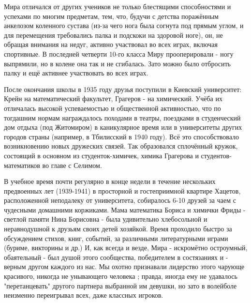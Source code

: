Мира отличался от других учеников не только блестящими способностями и успехами по многим предметам, тем, что, будучи с детства поражённым анкелозом коленного сустава (из-за чего нога была согнута под прямым углом, и для перемещения требовались палка и подскоки на здоровой ноге), он, не обращая внимания на недуг, активно участвовал во всех играх, включая спортивные. В последней четверти 10-го класса Миру прооперировали - ногу выпрямили, но в колене она так и не сгибалась. Зато можно было отбросить палку и ещё активнее участвовать во всех играх.

После окончания школы в 1935 году друзья поступили в Киевский университет: Крейн на математический факультет, Грагеров - на химический. Учёба их отличалась высокой успеваемостью и общественной активностью, что по тогдашним нормам награждалось походами в театры, поездками в студенческий дом отдыха (под Житомиром) в каникулярное время или в университеты других городов страны (например, в Тбилисский в 1940 году). Всё это способствовало возникновению новых дружеских связей. Так образовался сплочённый кружок, состоящий в основном из студенток-химичек, химика Грагерова и студентов-математиков во главе с Селимом.

В учебное время почти регулярно в конце недели в течение нескольких предвоенных лет (1939-1941) в просторной и гостеприимной квартире Хацетов, расположенной неподалеку от университета, собиралось 6-10 друзей за чаем с чудесными домашними коржиками. Мама математика Бориса и химички Фриды - светлой памяти Нина Борисовна - была удивительно хлебосольной и неравнодушной к друзьям своих детей хозяйкой. Время проходило быстро за обсуждением стихов, книг, событий, за различными литературными играми (буриме, викторины и др.) И, как всегда и везде, Мира - искромётно остроумный, обаятельный - был душой этого сообщества, победителем в состязаниях и - верным другом каждого из нас. Мы охотно признавали лидерство этого чарующе красивого, никогда не унывающего человека ; правда, иногда ему не удавалось "перетанцевать" другого партнера выбранной им девушки, но зато в волейболе неизменно переигрывал всех, даже классных игроков.

